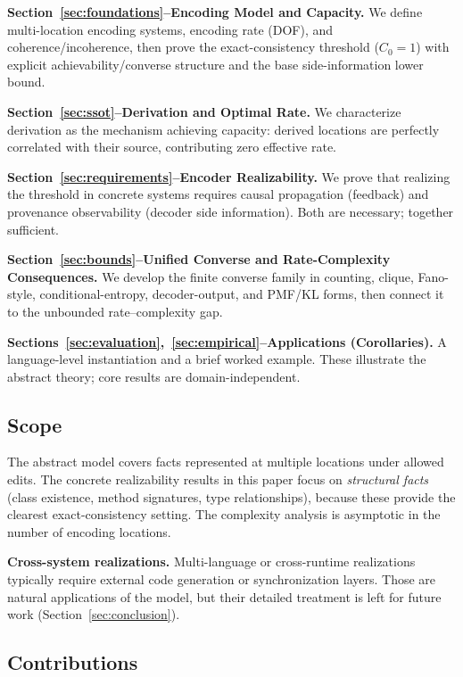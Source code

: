 \textbf{Section~\ref{sec:foundations}--Encoding Model and Capacity.} We define multi-location encoding systems, encoding rate (DOF), and coherence/incoherence, then prove the exact-consistency threshold ($C_0 = 1$) with explicit achievability/converse structure and the base side-information lower bound.

\textbf{Section~\ref{sec:ssot}--Derivation and Optimal Rate.} We characterize derivation as the mechanism achieving capacity: derived locations are perfectly correlated with their source, contributing zero effective rate.

\textbf{Section~\ref{sec:requirements}--Encoder Realizability.} We prove that realizing the threshold in concrete systems requires causal propagation (feedback) and provenance observability (decoder side information). Both are necessary; together sufficient.

\textbf{Section~\ref{sec:bounds}--Unified Converse and Rate-Complexity Consequences.} We develop the finite converse family in counting, clique, Fano-style, conditional-entropy, decoder-output, and PMF/KL forms, then connect it to the unbounded rate--complexity gap.

\textbf{Sections~\ref{sec:evaluation},~\ref{sec:empirical}--Applications (Corollaries).} A language-level instantiation and a brief worked example. These illustrate the abstract theory; core results are domain-independent.


\subsection{Scope}\label{sec:scope}

The abstract model covers facts represented at multiple locations under allowed edits. The concrete realizability results in this paper focus on \emph{structural facts} (class existence, method signatures, type relationships), because these provide the clearest exact-consistency setting. The complexity analysis is asymptotic in the number of encoding locations.

\textbf{Cross-system realizations.} Multi-language or cross-runtime realizations typically require external code generation or synchronization layers. Those are natural applications of the model, but their detailed treatment is left for future work (Section~\ref{sec:conclusion}).

\subsection{Contributions}\label{sec:contributions}

